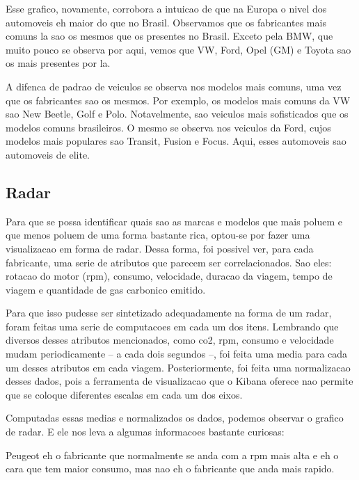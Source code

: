\documentclass[10pt, conference]{IEEEtran}
\begin{document}
Esse grafico, novamente, corrobora a intuicao de que na Europa o nivel dos automoveis eh maior do que no Brasil.
Observamos que os fabricantes mais comuns la sao os mesmos que os presentes no Brasil. Exceto pela BMW, que
muito pouco se observa por aqui, vemos que VW, Ford, Opel (GM) e Toyota sao os mais presentes por la.

A difenca de padrao de veiculos se observa nos modelos mais comuns, uma vez que os fabricantes sao os mesmos.
Por exemplo, os modelos mais comuns da VW sao New Beetle, Golf e Polo. Notavelmente, sao veiculos mais
sofisticados que os modelos comuns brasileiros. O mesmo se observa nos veiculos da Ford, cujos modelos
mais populares sao Transit, Fusion e Focus. Aqui, esses automoveis sao automoveis de elite.





\subsection{Radar}

Para que se possa identificar quais sao as marcas e modelos que mais poluem e que menos poluem
de uma forma bastante rica, optou-se por fazer uma visualizacao em forma de radar. Dessa forma,
foi possivel ver, para cada fabricante, uma serie de atributos que parecem ser correlacionados.
Sao eles: rotacao do motor (rpm), consumo, velocidade, duracao da viagem, tempo de viagem e 
quantidade de gas carbonico emitido. 

Para que isso pudesse ser sintetizado adequadamente na forma de um radar, foram feitas uma serie
de computacoes em cada um dos itens. Lembrando que diversos desses atributos mencionados, como
co2, rpm, consumo e velocidade mudam periodicamente -- a cada dois segundos --, foi feita uma media
para cada um desses atributos em cada viagem. Posteriormente, foi feita uma normalizacao desses dados,
pois a ferramenta de visualizacao que o Kibana oferece nao permite que se coloque diferentes escalas
em cada um dos eixos.

Computadas essas medias e normalizados os dados, podemos observar o grafico de radar. E ele nos leva
a algumas informacoes bastante curiosas:

Peugeot eh o fabricante que normalmente se anda com a rpm mais alta e eh o cara que tem maior consumo, 
mas nao eh o fabricante que anda mais rapido. 
\end{document}
